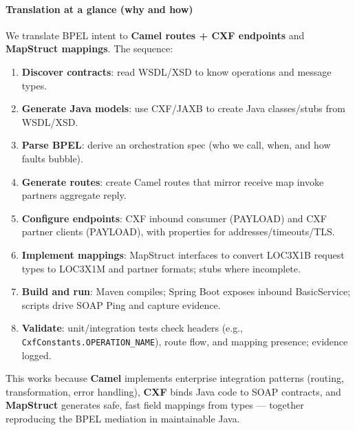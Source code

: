 \documentclass[11pt,a4paper]{article}
\begin{document}
\paragraph*{Translation at a glance (why and how)}
We translate BPEL intent to \textbf{Camel routes + CXF endpoints} and \textbf{MapStruct mappings}. The sequence:
\begin{enumerate}
  \item \textbf{Discover contracts}: read WSDL/XSD to know operations and message types.\
  \item \textbf{Generate Java models}: use CXF/JAXB to create Java classes/stubs from WSDL/XSD.\
  \item \textbf{Parse BPEL}: derive an orchestration spec (who we call, when, and how faults bubble).\
  \item \textbf{Generate routes}: create Camel routes that mirror receive \textrightarrow{} map \textrightarrow{} invoke partners \textrightarrow{} aggregate reply.\
  \item \textbf{Configure endpoints}: CXF inbound consumer (PAYLOAD) and CXF partner clients (PAYLOAD), with properties for addresses/timeouts/TLS.\
  \item \textbf{Implement mappings}: MapStruct interfaces to convert LOC3X1B request types to LOC3X1M and partner formats; stubs where incomplete.\
  \item \textbf{Build and run}: Maven compiles; Spring Boot exposes inbound BasicService; scripts drive SOAP Ping and capture evidence.\
  \item \textbf{Validate}: unit/integration tests check headers (e.g., \texttt{CxfConstants.OPERATION\_NAME}), route flow, and mapping presence; evidence logged.\
\end{enumerate}
This works because \textbf{Camel} implements enterprise integration patterns (routing, transformation, error handling), \textbf{CXF} binds Java code to SOAP contracts, and \textbf{MapStruct} generates safe, fast field mappings from types — together reproducing the BPEL mediation in maintainable Java.
\end{document}
